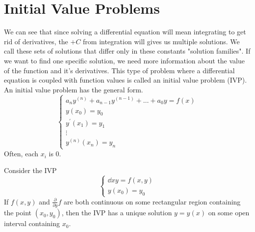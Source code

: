 \section{Initial Value Problems}
\noindent
We can see that since solving a differential equation will mean integrating to get rid of derivatives, the $+ C$ from integration will gives us multiple solutions. We call these sets of solutions that differ only in these constants "solution families". If we want to find one specific solution, we need more information about the value of the function and it's derivatives. This type of problem where a differential equation is coupled with function values is called an initial value problem (IVP).\\

\noindent
An initial value problem has the general form.
\begin{equation*}
	\begin{cases}
		a_ny^{(n)} + a_{n-1}y^{(n-1)} + \ldots + a_0y = f(x) \\
		y(x_0) = y_0 \\
		y^\prime(x_1) = y_1 \\
		\vdots \\
		y^{(n)}(x_n) = y_n
	\end{cases}
\end{equation*}
Often, each $x_i$ is 0.

\ifodd{}\fi

\begin{theorem}
	Consider the IVP
	\begin{equation*}
		\begin{cases}
			\dd{x}{y} = f(x,y) \\
			y(x_0) = y_0
		\end{cases}
	\end{equation*}
	If $f(x,y)$ and $\frac{\partial}{\partial y}f$ are both continuous on some rectangular region containing the point $(x_0, y_0)$, then the IVP has a unique solution $y = y(x)$ on some open interval containing $x_0$.
\end{theorem}

\ifodd{}\fi